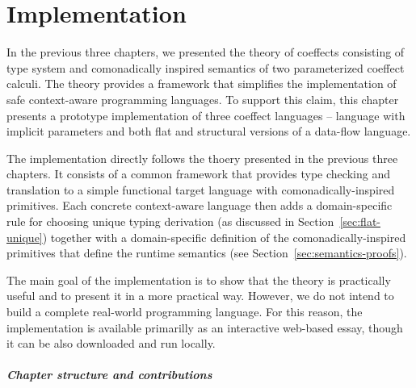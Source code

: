 
\chapter{Implementation}
\label{ch:impl}

In the previous three chapters, we presented the theory of coeffects consisting of type system
and comonadically inspired semantics of two parameterized coeffect calculi. The theory provides
a framework that simplifies the implementation of safe context-aware programming languages. To
support this claim, this chapter presents a prototype implementation of three coeffect languages --
language with implicit parameters and both flat and structural versions of a data-flow language.

The implementation directly follows the thoery presented in the previous three chapters. It
consists of a common framework that provides type checking and translation to a simple functional
target language with comonadically-inspired primitives. Each concrete context-aware language then
adds a domain-specific rule for choosing unique typing derivation (as discussed in
Section~\ref{sec:flat-unique}) together with a domain-specific definition of the
comonadically-inspired primitives that define the runtime semantics (see Section~\ref{sec:semantics-proofs}).

The main goal of the implementation is to show that the theory is practically useful and to present it
in a more practical way. However, we do not intend to build a complete real-world programming language.
For this reason, the implementation is available primarilly as an interactive web-based essay, though
it can be also downloaded and run locally.

\paragraph{Chapter structure and contributions}


